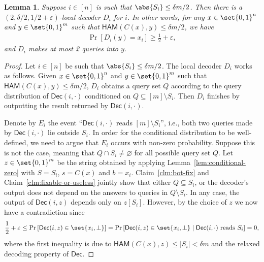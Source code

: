 \documentclass[10pt,a4paper]{article}
\newtheorem{lemma}{Lemma}
\theoremstyle{remark}
\newcommand{\eps}{\ensuremath{\varepsilon}}
\newcommand{\itn}[1]{^{(#1)}}
\newcommand{\Dec}{\ensuremath{\mathsf{Dec}}\xspace}
\newcommand{\HAM}{\ensuremath{\mathsf{HAM}}}
\newcommand{\authnote}[3]{\textcolor{#2}{{\sf (#1's Note: {\sl{#3}})}}}
\newcommand{\xnote}{\authnote{Xin}{magenta}}
\newcommand{\authnote}{}
\newcommand{\xnote}[1]{}
\newcommand{\ham}{\HAM\xspace}
\providecommand{\supp}{\operatorname{supp}}
\begin{document}
\begin{lemma} \label{lem:LDC-reduction}
	Suppose $i \in [n]$ is such that $\abs{S_{i}} \le \delta m/2$. Then there is a $(2,\delta/2,1/2+\eps)$-local decoder $D_i$ for $i$. In other words, for any $x \in \set{0,1}^{n}$ and $y \in \set{0,1}^{m}$ such that $\ham(C(x), y) \le \delta m/2$, we have
	\begin{align*}
	    \Pr\left[ D_i(y) = x_i \right] \ge \frac{1}{2} + \eps,
	\end{align*}
	and $D_i$ makes at most 2 queries into $y$.
\end{lemma}
\begin{proof}
	Let $i \in [n]$ be such that $\abs{S_{i}} \le \delta m/2$.
	The local decoder $D_i$ works as follows. Given $x \in \set{0,1}^{n}$ and $y \in \set{0,1}^{m}$ such that $\ham(C(x), y) \le \delta m/2$, $D_i$ obtains a query set $Q$ according to the query distribution of $\Dec(i,\cdot)$ conditioned on $Q \subseteq [m]\setminus S_i$. Then $D_i$ finishes by outputting the result returned by $\Dec(i,\cdot)$. 
	
	
	
	Denote by $E_i$ the event ``$\Dec(i,\cdot)$ reads $[m]\setminus S_i$'', i.e., both two queries made by $\Dec(i,\cdot)$ lie outside $S_i$. In order for the conditional distribution to be well-defined, we need to argue that $E_i$ occurs with non-zero probability. Suppose this is not the case, meaning that $Q \cap S_i \neq \varnothing$ for all possible query set $Q$. Let $z \in \set{0,1}^m$ be the string obtained by applying Lemma~\ref{lem:conditional-zero} with $S = S_i$, $s=C(x)$ and $b=x_i$. Claim~\ref{clm:bot-fix} and Claim~\ref{clm:fixable-or-useless} jointly show that either $Q \subseteq S_i$, or the decoder's output does not depend on the answers to queries in $Q \setminus S_i$. In any case, the output of $\Dec(i,z)$ depends only on $z[S_i]$. However, by the choice of $z$ we now have a contradiction since 
	\begin{align*}
		\frac{1}{2} + \eps \le \Pr\left[ \Dec(i,z) \in \set{x_i, \perp} \right] = \Pr\left[ \Dec(i,z) \in \set{x_i, \perp} \mid \Dec(i,\cdot)\textup{ reads }S_i \right] = 0,
	\end{align*}
	where the first inequality is due to $\ham(C(x),z)\le |S_i| < \delta m$ and the relaxed decoding property of $\Dec$.
	

\end{proof}
\end{document}
